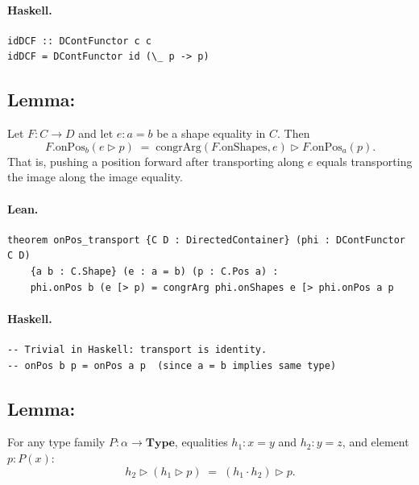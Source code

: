 \documentclass[11pt,a4paper]{article}
\begin{document}
\paragraph{Haskell.}
\begin{lstlisting}[style=haskell]
idDCF :: DContFunctor c c
idDCF = DContFunctor id (\_ p -> p)
\end{lstlisting}


\subsection{Lemma: }

\begin{prop}
Let $F : C \to D$ and let $e : a = b$ be a shape equality in $C$.  Then
\[
  F.\mathrm{onPos}_b(e \triangleright p)
  \;=\;
  \mathrm{congrArg}(F.\mathrm{onShapes}, e) \triangleright F.\mathrm{onPos}_a(p).
\]
That is, pushing a position forward after transporting along $e$ equals
transporting the image along the image equality.
\end{prop}

\paragraph{Lean.}
\begin{lstlisting}[style=lean]
theorem onPos_transport {C D : DirectedContainer} (phi : DContFunctor C D)
    {a b : C.Shape} (e : a = b) (p : C.Pos a) :
    phi.onPos b (e [> p) = congrArg phi.onShapes e [> phi.onPos a p
\end{lstlisting}

\paragraph{Haskell.}
\begin{lstlisting}[style=haskell]
-- Trivial in Haskell: transport is identity.
-- onPos b p = onPos a p  (since a = b implies same type)
\end{lstlisting}


\subsection{Lemma: }

\begin{prop}
For any type family $P : \alpha \to \mathbf{Type}$, equalities $h_1 : x = y$
and $h_2 : y = z$, and element $p : P(x)$:
\[
  h_2 \triangleright (h_1 \triangleright p) \;=\; (h_1 \cdot h_2) \triangleright p.
\]
\end{prop}
\end{document}
